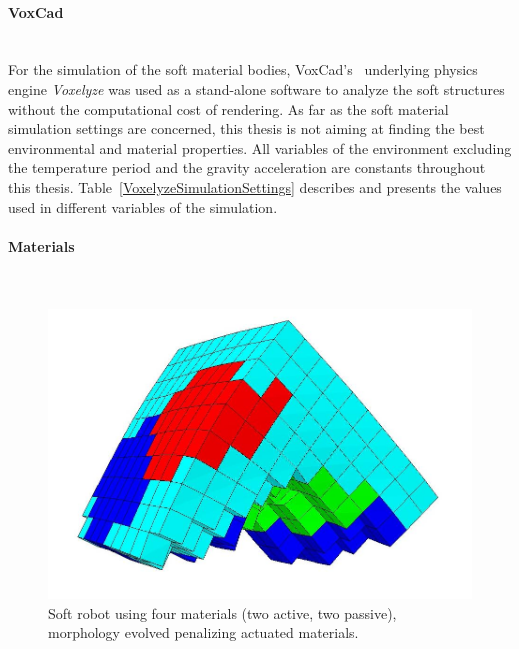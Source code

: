 \paragraph*{VoxCad}~\\

For the simulation of the soft material bodies, VoxCad's~\citep{hiller2012dynamic} underlying physics engine \emph{Voxelyze} was used as a stand-alone software to analyze the soft structures without the computational cost of rendering. As far as the soft material simulation settings are concerned, this thesis is not aiming at finding the best environmental and material properties. All variables of the environment excluding the temperature period and the gravity acceleration are constants throughout this thesis. Table~\ref{VoxelyzeSimulationSettings} describes and presents the values used in different variables of the simulation.



\paragraph*{Materials}~\\

\begin{figure}
\centering
\includegraphics[height=0.2\textheight]{../Figures/Misc/allSoftMaterials.png}
\caption{Soft robot using four materials (two active, two passive), morphology evolved penalizing actuated materials.}
\label{fig:allSoftMaterials}
\end{figure}

